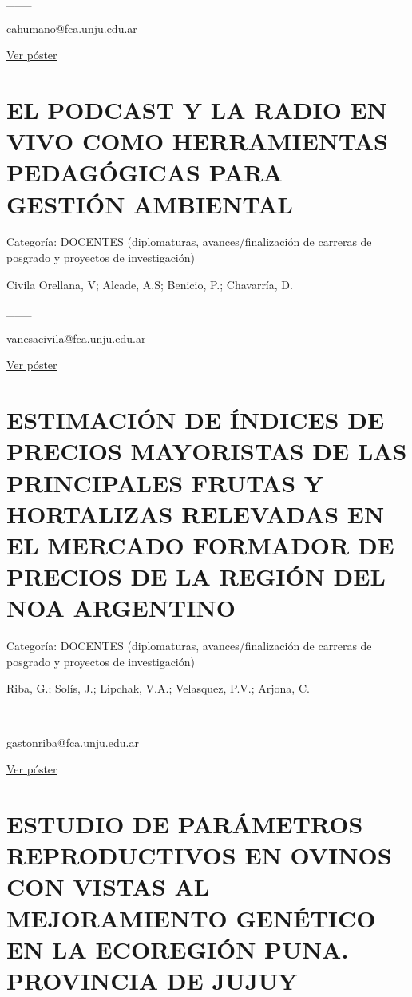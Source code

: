 \documentclass[
  spanish,
  letterpaper,
  DIV=11,
  numbers=noendperiod]{scrreprt}
\begin{document}
\_\_\_

cahumano@fca.unju.edu.ar

\href{https://drive.google.com/open?id=1VRTi0OW4pzcy7BF8uSfXUUm4uYk0oEFb}{Ver
póster}

\section{EL PODCAST Y LA RADIO EN VIVO COMO HERRAMIENTAS PEDAGÓGICAS
PARA GESTIÓN
AMBIENTAL}\label{el-podcast-y-la-radio-en-vivo-como-herramientas-pedaguxf3gicas-para-gestiuxf3n-ambiental}

Categoría: DOCENTES (diplomaturas, avances/finalización de carreras de
posgrado y proyectos de investigación)

Civila Orellana, V; Alcade, A.S; Benicio, P.; Chavarría, D.

\_\_\_

vanesacivila@fca.unju.edu.ar

\href{https://drive.google.com/open?id=1nNhH4qpN_t9YgZolxseKLYDLM2BDCMc5}{Ver
póster}

\section{ESTIMACIÓN DE ÍNDICES DE PRECIOS MAYORISTAS DE LAS PRINCIPALES
FRUTAS Y HORTALIZAS RELEVADAS EN EL MERCADO FORMADOR DE PRECIOS DE LA
REGIÓN DEL NOA
ARGENTINO}\label{estimaciuxf3n-de-uxedndices-de-precios-mayoristas-de-las-principales-frutas-y-hortalizas-relevadas-en-el-mercado-formador-de-precios-de-la-regiuxf3n-del-noa-argentino}

Categoría: DOCENTES (diplomaturas, avances/finalización de carreras de
posgrado y proyectos de investigación)

Riba, G.; Solís, J.; Lipchak, V.A.; Velasquez, P.V.; Arjona, C.

\_\_\_

gastonriba@fca.unju.edu.ar

\href{https://drive.google.com/open?id=14aWUOPrRAwUDfQoWtnxiLj8mSPWV0_Pg}{Ver
póster}

\section{ESTUDIO DE PARÁMETROS REPRODUCTIVOS EN OVINOS CON VISTAS AL
MEJORAMIENTO GENÉTICO EN LA ECOREGIÓN PUNA. PROVINCIA DE
JUJUY}\label{estudio-de-paruxe1metros-reproductivos-en-ovinos-con-vistas-al-mejoramiento-genuxe9tico-en-la-ecoregiuxf3n-puna.-provincia-de-jujuy}
\end{document}
